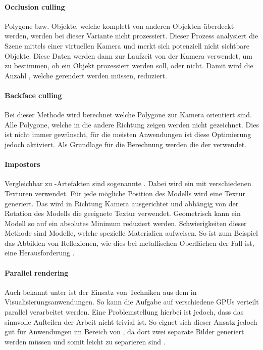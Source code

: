\paragraph{Occlusion culling}
Polygone bzw. Objekte, welche komplett von anderen Objekten überdeckt werden, werden bei dieser Variante nicht prozessiert.
Dieser Prozess analysiert die Szene mittels einer virtuellen Kamera und merkt sich potenziell nicht sichtbare Objekte. Diese Daten werden dann zur Laufzeit von der Kamera verwendet, um zu bestimmen, ob ein Objekt prozessiert werden soll, oder nicht.
Damit wird die Anzahl , welche gerendert werden müssen, reduziert.

\paragraph{Backface culling}
\label{chap:backfaceCulling}
Bei dieser Methode wird berechnet welche Polygone zur Kamera orientiert sind.
Alle Polygone, welche in die andere Richtung zeigen werden nicht gezeichnet.
Dies ist nicht immer gewünscht, für die meisten Anwendungen ist diese Optimierung jedoch aktiviert.
Als Grundlage für die Berechnung werden die  der  verwendet.

\paragraph{Impostors}
Vergleichbar zu -Artefakten sind sogenannte . Dabei wird ein  mit verschiedenen Texturen verwendet. Für jede mögliche Position des Modells wird eine Textur generiert. Das  wird in Richtung Kamera ausgerichtet und abhängig von der Rotation des Modells die geeignete Textur verwendet. Geometrisch kann ein Modell so auf ein absolutes Minimum reduziert werden. Schwierigkeiten dieser Methode sind Modelle, welche spezielle Materialien aufweisen. So ist zum Beispiel das Abbilden von Reflexionen, wie dies bei metallischen Oberflächen der Fall ist, eine Herausforderung \cite{usingImpostors}.

\paragraph{Parallel rendering}
Auch bekannt unter  ist der Einsatz von Techniken aus dem  in Visualisierungsanwendungen. So kann die Aufgabe auf verschiedene \glspl{GPU} verteilt parallel verarbeitet werden. Eine Problemstellung hierbei ist jedoch, dass das sinnvolle Aufteilen der Arbeit nicht trivial ist. So eignet sich dieser Ansatz jedoch gut für Anwendungen im Bereich von , da dort zwei separate Bilder generiert werden müssen und somit leicht zu separieren sind \cite{parallelRenderingPhd}.

